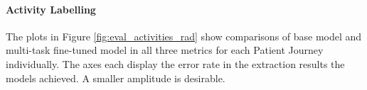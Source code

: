 \paragraph{Activity Labelling} The plots in Figure \ref{fig:eval_activities_rad} show comparisons of base model and multi-task fine-tuned model in all three metrics for each Patient Journey individually. The axes each display the error rate in the extraction results the models achieved. A smaller amplitude is desirable.\\
\begin{figure}
  \centering

\end{figure}
